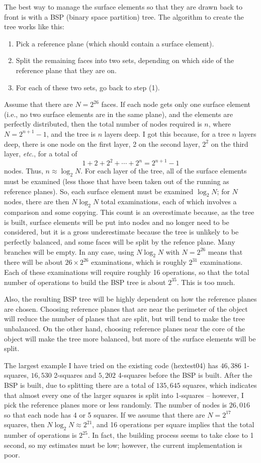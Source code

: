 \documentclass[titlepage,oneside,10pt]{article}
\begin{document}
The best way to manage the surface elements so that they are drawn
back to front is with a BSP (binary space partition) tree.  The
algorithm to create the tree works like this:
\begin{enumerate}
\item Pick a reference plane (which should contain a surface element).
\item Split the remaining faces into two sets, depending on which side
  of the reference plane that they are on.
\item For each of these two sets, go back to step (1).
\end{enumerate}
Assume that there are $N=2^{26}$ faces. If each node gets only one
surface element (i.e., no two surface elements are in the same plane),
and the elements are perfectly distributed, then the total number of
nodes required is $n$, where $N=2^{n+1}-1$, and the tree is $n$ layers
deep. I got this because, for a tree $n$ layers deep, there is one
node on the first layer, 2 on the second layer, $2^2$ on the third
layer, \emph{etc}., for a total of
$$1+2+2^2+\cdots+2^{n} = 2^{n+1}-1$$
nodes. Thus, $n\approx\log_2N$. For each layer of the tree, all of the
surface elements must be examined (less those that have been taken out
of the running as reference planes). So, each surface element must be
examined $\log_2 N$; for $N$ nodes, there are then $N\log_2N$ total
examinations, each of which involves a comparison and some
copying. This count is an overestimate because, as the tree is built,
surface elements will be put into nodes and no longer need to be
considered, but it is a gross underestimate because the tree is
unlikely to be perfectly balanced, and some faces will be split by the
refence plane. Many branches will be empty. In any
case, using $N\log_2N$ with $N=2^{26}$ means that there will be about
$26\times2^{26}$ examinations, which is roughly $2^{31}$
examinations. Each of these examinations will require roughly 16
operations, so that the total number of operations to build the BSP
tree is about $2^{35}$. This is too much.

Also, the resulting BSP tree will be highly dependent on how the
reference planes are chosen. Choosing reference planes that are near
the perimeter of the object will reduce the number of planes that are
split, but will tend to make the tree unbalanced. On the other hand,
choosing reference planes near the core of the object will make the
tree more balanced, but more of the surface elements will be split.

The largest example I have tried on the existing code (hextest04) has
$46,386$ 1-squares, $16,530$ 2-squares and $5,202$ 4-squares before
the BSP is built. After the BSP is built, due to splitting there are a
total of $135,645$ squares, which indicates that almost every one of
the larger squares is split into 1-squares -- however, I pick the
reference planes more or less randomly. The number of nodes is
$26,016$ so that each node has 4 or 5 squares. If we assume that there
are $N=2^{17}$ squares, then $N\log_2N \approx 2^{21}$, and 16
operations per square implies that the total number of operations is
$2^{25}$. In fact, the building process seems to take close to 1
second, so my estimates must be low; however, the current
implementation is poor. 
\end{document}
